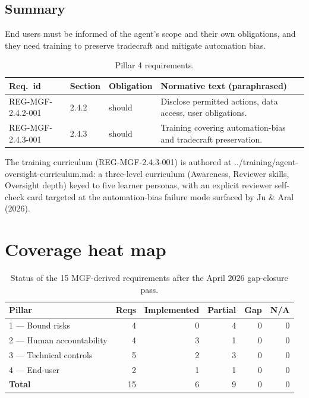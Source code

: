 \documentclass[11pt,a4paper,twoside]{report}
\newcommand{\corpus}{}
\begin{document}
\subsection*{Summary}

End users must be informed of the agent's scope and their own
obligations, and they need training to preserve tradecraft and mitigate
automation bias.

\begin{table}[h]
\centering
\small
\begin{tabularx}{\textwidth}{p{3.2cm}p{1.4cm}p{1.6cm}X}
\toprule
\textbf{Req.\ id} & \textbf{Section} & \textbf{Obligation} & \textbf{Normative text (paraphrased)} \\
\midrule
REG-MGF-2.4.2-001 & 2.4.2 & should & Disclose permitted actions, data access, user obligations. \\
REG-MGF-2.4.3-001 & 2.4.3 & should & Training covering automation-bias and tradecraft preservation. \\
\bottomrule
\end{tabularx}
\caption{Pillar 4 requirements.}
\label{tab:p4}
\end{table}

The training curriculum (REG-MGF-2.4.3-001) is authored at
\corpus{../training/agent-oversight-curriculum.md}: a three-level
curriculum (Awareness, Reviewer skills, Oversight depth) keyed to
five learner personas, with an explicit reviewer self-check card
targeted at the automation-bias failure mode surfaced by Ju \& Aral
(2026).

\section{Coverage heat map}

\begin{table}[h]
\centering
\small
\begin{tabularx}{\textwidth}{lrrrrr}
\toprule
\textbf{Pillar} & \textbf{Reqs} & \textbf{Implemented} & \textbf{Partial} & \textbf{Gap} & \textbf{N/A} \\
\midrule
1 --- Bound risks          & 4 & 0 & 4 & 0 & 0 \\
2 --- Human accountability & 4 & 3 & 1 & 0 & 0 \\
3 --- Technical controls   & 5 & 2 & 3 & 0 & 0 \\
4 --- End-user             & 2 & 1 & 1 & 0 & 0 \\
\midrule
\textbf{Total}             & 15 & 6 & 9 & 0 & 0 \\
\bottomrule
\end{tabularx}
\caption{Status of the 15 MGF-derived requirements after the
April 2026 gap-closure pass.}
\label{tab:mgf-coverage}
\end{table}
\end{document}
